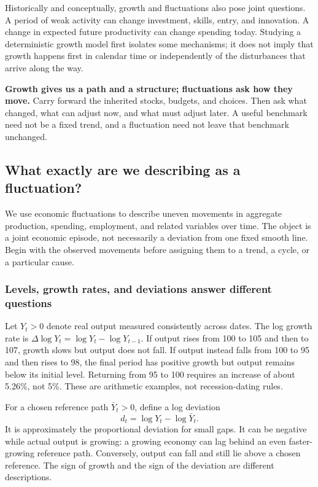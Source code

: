 Historically and conceptually, growth and fluctuations also pose joint
questions. A period of weak activity can change investment, skills, entry,
and innovation. A change in expected future productivity can change spending
today. Studying a deterministic growth model first isolates some mechanisms;
it does not imply that growth happens first in calendar time or independently
of the disturbances that arrive along the way.

\begin{greenblock}
\textbf{Growth gives us a path and a structure; fluctuations ask how they move.}
Carry forward the inherited stocks, budgets, and choices. Then ask what
changed, what can adjust now, and what must adjust later. A useful benchmark
need not be a fixed trend, and a fluctuation need not leave that benchmark
unchanged.
\end{greenblock}

\subsection{What exactly are we describing as a fluctuation?}

We use economic fluctuations to describe uneven movements in aggregate
production, spending, employment, and related variables over time. The
object is a joint economic episode, not necessarily a deviation from one
fixed smooth line. Begin with the observed movements before assigning them
to a trend, a cycle, or a particular cause.

\subsubsection{Levels, growth rates, and deviations answer different questions}

Let $Y_t>0$ denote real output measured consistently across dates. The
log growth rate is $\Delta\log Y_t=\log Y_t-\log Y_{t-1}$. If output
rises from 100 to 105 and then to 107, growth slows but output does not fall.
If output instead falls from 100 to 95 and then rises to 98, the final
period has positive growth but output remains below its initial level.
Returning from 95 to 100 requires an increase of about 5.26\%, not 5\%.
These are arithmetic examples, not recession-dating rules.

For a chosen reference path $\bar Y_t>0$, define a log deviation
\[
d_t=\log Y_t-\log\bar Y_t.
\]
It is approximately the proportional deviation for small gaps. It can be
negative while actual output is growing: a growing economy can lag behind
an even faster-growing reference path. Conversely, output can fall and
still lie above a chosen reference. The sign of growth and the sign of
the deviation are different descriptions.

